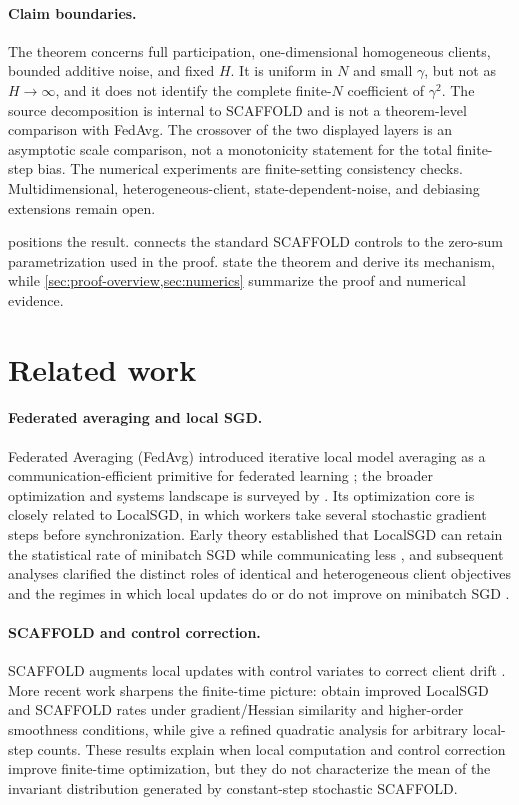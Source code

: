 \documentclass[11pt]{article}
\theoremstyle{definition}
\newcommand{\Scaf}{\textnormal{\textsc{SCAFFOLD}}}
\begin{document}
\paragraph{Claim boundaries.}
The theorem concerns full participation, one-dimensional homogeneous clients, bounded additive noise, and fixed $H$. It is uniform in $N$ and small $\gamma$, but not as $H\to\infty$, and it does not identify the complete finite-$N$ coefficient of $\gamma^2$. The source decomposition is internal to \Scaf{} and is not a theorem-level comparison with FedAvg. The crossover of the two displayed layers is an asymptotic scale comparison, not a monotonicity statement for the total finite-step bias. The numerical experiments are finite-setting consistency checks. Multidimensional, heterogeneous-client, state-dependent-noise, and debiasing extensions remain open.

 positions the result.  connects the standard \Scaf{} controls to the zero-sum parametrization used in the proof.  state the theorem and derive its mechanism, while \cref{sec:proof-overview,sec:numerics} summarize the proof and numerical evidence.

\section{Related work}
\label{sec:related}

\paragraph{Federated averaging and local SGD.}
Federated Averaging (FedAvg) introduced iterative local model averaging as a communication-efficient primitive for federated learning \citep{mcmahan2017fedavg}; the broader optimization and systems landscape is surveyed by \citet{kairouz2021federated}. Its optimization core is closely related to LocalSGD, in which workers take several stochastic gradient steps before synchronization. Early theory established that LocalSGD can retain the statistical rate of minibatch SGD while communicating less \citep{stich2019localsgd}, and subsequent analyses clarified the distinct roles of identical and heterogeneous client objectives \citep{khaled2020localsgd} and the regimes in which local updates do or do not improve on minibatch SGD \citep{woodworth2020localsgd}.

\paragraph{SCAFFOLD and control correction.}
\Scaf{} augments local updates with control variates to correct client drift \citep{karimireddy2020scaffold}. More recent work sharpens the finite-time picture: \citet{luo2025revisiting} obtain improved LocalSGD and \Scaf{} rates under gradient/Hessian similarity and higher-order smoothness conditions, while \citet{mangold2025sharper} give a refined quadratic analysis for arbitrary local-step counts. These results explain when local computation and control correction improve finite-time optimization, but they do not characterize the mean of the invariant distribution generated by constant-step stochastic \Scaf{}.
\end{document}
